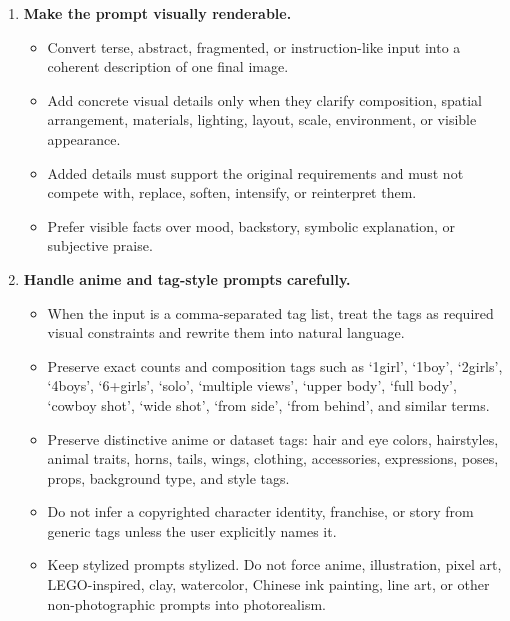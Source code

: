 \begin{tcolorbox}
\begin{enumerate}[leftmargin=1.5em, itemsep=0.2em, topsep=0.2em, parsep=0pt, partopsep=0pt]
    \item \textbf{Make the prompt visually renderable.}
    \begin{itemize}[leftmargin=1.5em, itemsep=0pt, topsep=0pt, parsep=0pt, partopsep=0pt]
        \item Convert terse, abstract, fragmented, or instruction-like input into a coherent description of one final image.
        \item Add concrete visual details only when they clarify composition, spatial arrangement, materials, lighting, layout, scale, environment, or visible appearance.
        \item Added details must support the original requirements and must not compete with, replace, soften, intensify, or reinterpret them.
        \item Prefer visible facts over mood, backstory, symbolic explanation, or subjective praise.
    \end{itemize}

    \item \textbf{Handle anime and tag-style prompts carefully.}
    \begin{itemize}[leftmargin=1.5em, itemsep=0pt, topsep=0pt, parsep=0pt, partopsep=0pt]
        \item When the input is a comma-separated tag list, treat the tags as required visual constraints and rewrite them into natural language.
        \item Preserve exact counts and composition tags such as `1girl', `1boy', `2girls', `4boys', `6+girls', `solo', `multiple views', `upper body', `full body', `cowboy shot', `wide shot', `from side', `from behind', and similar terms.
        \item Preserve distinctive anime or dataset tags: hair and eye colors, hairstyles, animal traits, horns, tails, wings, clothing, accessories, expressions, poses, props, background type, and style tags.
        \item Do not infer a copyrighted character identity, franchise, or story from generic tags unless the user explicitly names it.
        \item Keep stylized prompts stylized. Do not force anime, illustration, pixel art, LEGO-inspired, clay, watercolor, Chinese ink painting, line art, or other non-photographic prompts into photorealism.
    \end{itemize}


\end{enumerate}
\end{tcolorbox}
